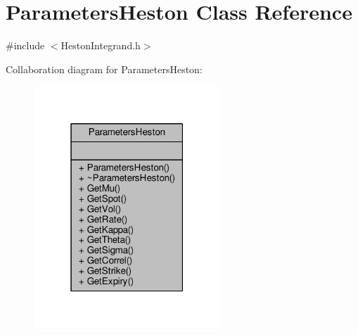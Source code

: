 \hypertarget{classParametersHeston}{}\section{Parameters\+Heston Class Reference}
\label{classParametersHeston}


{\ttfamily \#include $<$Heston\+Integrand.\+h$>$}



Collaboration diagram for Parameters\+Heston\+:
\nopagebreak
\begin{figure}[H]
\begin{center}
\leavevmode
\includegraphics[width=199pt]{classParametersHeston__coll__graph}
\end{center}
\end{figure}
